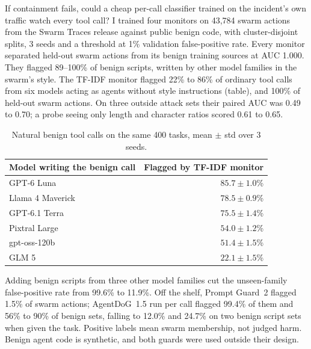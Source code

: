{If containment fails, could a cheap per-call classifier trained on the incident's own traffic watch every tool call?
I trained four monitors on 43,784 swarm actions from the Swarm Traces release against public benign code, with cluster-disjoint splits, 3 seeds and a threshold at 1\% validation false-positive rate.
Every monitor separated held-out swarm actions from its benign training sources at AUC 1.000.
They flagged 89--100\% of benign scripts, written by other model families in the swarm's style.
The TF-IDF monitor flagged 22\% to 86\% of ordinary tool calls from six models acting as agents without style instructions (table), and 100\% of held-out swarm actions.
On three outside attack sets their paired AUC was 0.49 to 0.70; a probe seeing only length and character ratios scored 0.61 to 0.65.

\begin{table}[!ht]\centering\small
\begin{tabular}{lr}\toprule
Model writing the benign call & Flagged by TF-IDF monitor \\\midrule
GPT-6 Luna & $85.7\pm1.0$\% \\
Llama 4 Maverick & $78.5\pm0.9$\% \\
GPT-6.1 Terra & $75.5\pm1.4$\% \\
Pixtral Large & $54.0\pm1.2$\% \\
gpt-oss-120b & $51.4\pm1.5$\% \\
GLM 5 & $22.1\pm1.5$\% \\\bottomrule
\end{tabular}
\caption{Natural benign tool calls on the same 400 tasks, mean $\pm$ std over 3 seeds.}
\end{table}

Adding benign scripts from three other model families cut the unseen-family false-positive rate from 99.6\% to 11.9\%.
Off the shelf, Prompt Guard~2 flagged 1.5\% of swarm actions; AgentDoG~1.5 run per call flagged 99.4\% of them and 56\% to 90\% of benign sets, falling to 12.0\% and 24.7\% on two benign script sets when given the task.
Positive labels mean swarm membership, not judged harm. Benign agent code is synthetic, and both guards were used outside their design.

}

